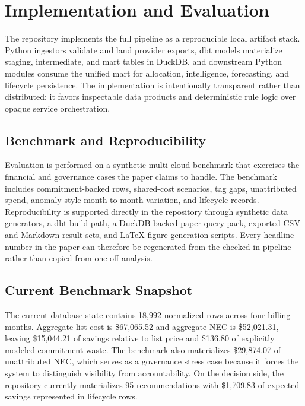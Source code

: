 \section{Implementation and Evaluation}
\label{sec:eval}

The repository implements the full pipeline as a reproducible local artifact stack. Python ingestors validate and land provider exports, dbt models materialize staging, intermediate, and mart tables in DuckDB, and downstream Python modules consume the unified mart for allocation, intelligence, forecasting, and lifecycle persistence. The implementation is intentionally transparent rather than distributed: it favors inspectable data products and deterministic rule logic over opaque service orchestration.

\subsection{Benchmark and Reproducibility}
Evaluation is performed on a synthetic multi-cloud benchmark that exercises the financial and governance cases the paper claims to handle. The benchmark includes commitment-backed rows, shared-cost scenarios, tag gaps, unattributed spend, anomaly-style month-to-month variation, and lifecycle records. Reproducibility is supported directly in the repository through synthetic data generators, a dbt build path, a DuckDB-backed paper query pack, exported CSV and Markdown result sets, and LaTeX figure-generation scripts. Every headline number in the paper can therefore be regenerated from the checked-in pipeline rather than copied from one-off analysis.

\subsection{Current Benchmark Snapshot}
The current database state contains 18{,}992 normalized rows across four billing months. Aggregate list cost is \$67{,}065.52 and aggregate NEC is \$52{,}021.31, leaving \$15{,}044.21 of savings relative to list price and \$136.80 of explicitly modeled commitment waste. The benchmark also materializes \$29{,}874.07 of unattributed NEC, which serves as a governance stress case because it forces the system to distinguish visibility from accountability. On the decision side, the repository currently materializes 95 recommendations with \$1{,}709.83 of expected savings represented in lifecycle rows.

